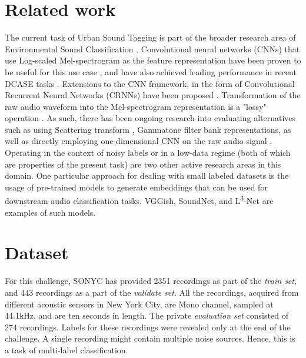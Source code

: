 \documentclass{article}
\begin{document}
\begin{sloppy}
\section{Related work}
\label{sec:related}

The current task of Urban Sound Tagging is part of the broader research area of Environmental Sound Classification \cite{houix2012lexical}. Convolutional neural networks (CNNs) that use Log-scaled Mel-spectrogram as the feature representation have been proven to be useful for this use case \cite{salamon2017deep, Lasseck2018}, and have also achieved leading performance in recent DCASE tasks \cite{Jeong2018, Akiyama2019, Chen2019}. Extensions to the CNN framework, in the form of Convolutional Recurrent Neural Networks (CRNNs) have been proposed \cite{zhang2019attention}. Transformation of the raw audio waveform into the Mel-spectrogram representation is a "lossy" operation \cite{wyse2017audio}. As such, there has been ongoing research into evaluating alternatives such as using Scattering transform \cite{salamon2015feature},  Gammatone filter bank \cite{zhang2019attention} representations, as well as directly employing one-dimensional CNN on the raw audio signal \cite{abdoli2019end}. Operating in the context of noisy labels \cite{fonseca2019learning} or in a low-data regime \cite{pons2018training} (both of which are properties of the present task) are two other active research areas in this domain. One particular approach for dealing with small labeled datasets is the usage of pre-trained models to generate embeddings that can be used for downstream audio classification tasks. VGGish\cite{hershey2017cnn}, SoundNet\cite{aytar2016soundnet}, and L\textsuperscript{3}-Net\cite{cramer2019look} are examples of such models.


\section{Dataset}
\label{sec:dataset}

For this challenge, SONYC \cite{Bello2019sonyc} has provided 2351 recordings as part of the \textit{train set}, and 443 recordings as a part of the \textit{validate set}. All the recordings, acquired from different acoustic sensors in New York City, are Mono channel, sampled at 44.1kHz, and are ten seconds in length. The private \textit{evaluation set} consisted of 274 recordings. Labels for these recordings were revealed only at the end of the challenge. A single recording might contain multiple noise sources. Hence, this is a task of multi-label classification.



\end{sloppy}
\end{document}
